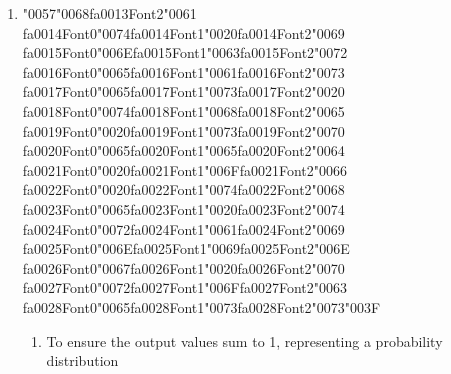 \documentclass[12pt]{article}
\begin{document}
\begin{enumerate}[label=Q\arabic*.]
\begin{enumerate}[label=(\Alph*)]
    \item To store the final output of the entire sequence.
    \item To act as a memory that carries information from previous time steps
    \item To calculate the loss function for the current word
    \item To normalize the input embeddings
\end{enumerate}
\item {\char"0057}{\char"0068}{\csname fa0013Font2\endcsname\char"0061} {\csname fa0014Font0\endcsname\char"0074}{\csname fa0014Font1\endcsname\char"0020}{\csname fa0014Font2\endcsname\char"0069} {\csname fa0015Font0\endcsname\char"006E}{\csname fa0015Font1\endcsname\char"0063}{\csname fa0015Font2\endcsname\char"0072} {\csname fa0016Font0\endcsname\char"0065}{\csname fa0016Font1\endcsname\char"0061}{\csname fa0016Font2\endcsname\char"0073} {\csname fa0017Font0\endcsname\char"0065}{\csname fa0017Font1\endcsname\char"0073}{\csname fa0017Font2\endcsname\char"0020} {\csname fa0018Font0\endcsname\char"0074}{\csname fa0018Font1\endcsname\char"0068}{\csname fa0018Font2\endcsname\char"0065} {\csname fa0019Font0\endcsname\char"0020}{\csname fa0019Font1\endcsname\char"0073}{\csname fa0019Font2\endcsname\char"0070} {\csname fa0020Font0\endcsname\char"0065}{\csname fa0020Font1\endcsname\char"0065}{\csname fa0020Font2\endcsname\char"0064} {\csname fa0021Font0\endcsname\char"0020}{\csname fa0021Font1\endcsname\char"006F}{\csname fa0021Font2\endcsname\char"0066} {\csname fa0022Font0\endcsname\char"0020}{\csname fa0022Font1\endcsname\char"0074}{\csname fa0022Font2\endcsname\char"0068} {\csname fa0023Font0\endcsname\char"0065}{\csname fa0023Font1\endcsname\char"0020}{\csname fa0023Font2\endcsname\char"0074} {\csname fa0024Font0\endcsname\char"0072}{\csname fa0024Font1\endcsname\char"0061}{\csname fa0024Font2\endcsname\char"0069} {\csname fa0025Font0\endcsname\char"006E}{\csname fa0025Font1\endcsname\char"0069}{\csname fa0025Font2\endcsname\char"006E} {\csname fa0026Font0\endcsname\char"0067}{\csname fa0026Font1\endcsname\char"0020}{\csname fa0026Font2\endcsname\char"0070} {\csname fa0027Font0\endcsname\char"0072}{\csname fa0027Font1\endcsname\char"006F}{\csname fa0027Font2\endcsname\char"0063} {\csname fa0028Font0\endcsname\char"0065}{\csname fa0028Font1\endcsname\char"0073}{\csname fa0028Font2\endcsname\char"0073}{\char"003F}
\begin{enumerate}[label=(\Alph*)]
    \item To ensure the output values sum to 1, representing a probability distribution

\end{enumerate}
\end{enumerate}
\end{document}
